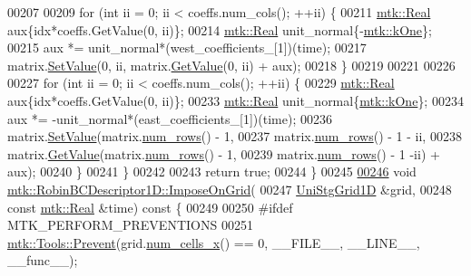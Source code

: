 \begin{DoxyCode}
00207 
00209     \textcolor{keywordflow}{for} (\textcolor{keywordtype}{int} ii = 0; ii < coeffs.num\_cols(); ++ii) \{
00211       \hyperlink{group__c01-roots_gac080bbbf5cbb5502c9f00405f894857d}{mtk::Real} aux\{idx*coeffs.GetValue(0, ii)\};
00214       \hyperlink{group__c01-roots_gac080bbbf5cbb5502c9f00405f894857d}{mtk::Real} unit\_normal\{-\hyperlink{group__c01-roots_ga26407c24d43b6b95480943340d285c71}{mtk::kOne}\};
00215       aux *= unit\_normal*(west\_coefficients\_[1])(time);
00217       matrix.\hyperlink{classmtk_1_1DenseMatrix_a784ce5784109ac86bfb9d8562b334b13}{SetValue}(0, ii, matrix.\hyperlink{classmtk_1_1DenseMatrix_a4b23ecbebd970b5eea915dbb50691024}{GetValue}(0, ii) + aux);
00218     \}
00219 
00221 
00226 
00227     \textcolor{keywordflow}{for} (\textcolor{keywordtype}{int} ii = 0; ii < coeffs.num\_cols(); ++ii) \{
00229       \hyperlink{group__c01-roots_gac080bbbf5cbb5502c9f00405f894857d}{mtk::Real} aux\{idx*coeffs.GetValue(0, ii)\};
00233       \hyperlink{group__c01-roots_gac080bbbf5cbb5502c9f00405f894857d}{mtk::Real} unit\_normal\{\hyperlink{group__c01-roots_ga26407c24d43b6b95480943340d285c71}{mtk::kOne}\};
00234       aux *= -unit\_normal*(east\_coefficients\_[1])(time);
00236       matrix.\hyperlink{classmtk_1_1DenseMatrix_a784ce5784109ac86bfb9d8562b334b13}{SetValue}(matrix.\hyperlink{classmtk_1_1DenseMatrix_a53f3afb3b6a8d21854458aaa9663cc74}{num\_rows}() - 1,
00237                       matrix.\hyperlink{classmtk_1_1DenseMatrix_a53f3afb3b6a8d21854458aaa9663cc74}{num\_rows}() - 1 - ii,
00238                       matrix.\hyperlink{classmtk_1_1DenseMatrix_a4b23ecbebd970b5eea915dbb50691024}{GetValue}(matrix.\hyperlink{classmtk_1_1DenseMatrix_a53f3afb3b6a8d21854458aaa9663cc74}{num\_rows}() - 1,
00239                                       matrix.\hyperlink{classmtk_1_1DenseMatrix_a53f3afb3b6a8d21854458aaa9663cc74}{num\_rows}() - 1 -ii) + aux);
00240     \}
00241   \}
00242 
00243   \textcolor{keywordflow}{return} \textcolor{keyword}{true};
00244 \}
00245 
\hypertarget{mtk__robin__bc__descriptor__1d_8cc_source_l00246}{}\hyperlink{classmtk_1_1RobinBCDescriptor1D_ab0daec1d6c5c9c6768bea08281a3831d}{00246} \textcolor{keywordtype}{void} \hyperlink{classmtk_1_1RobinBCDescriptor1D_ab0daec1d6c5c9c6768bea08281a3831d}{mtk::RobinBCDescriptor1D::ImposeOnGrid}(
00247     \hyperlink{classmtk_1_1UniStgGrid1D}{UniStgGrid1D} &grid,
00248     \textcolor{keyword}{const} \hyperlink{group__c01-roots_gac080bbbf5cbb5502c9f00405f894857d}{mtk::Real} &time)\textcolor{keyword}{ const }\{
00249 
00250 \textcolor{preprocessor}{  #ifdef MTK\_PERFORM\_PREVENTIONS}
00251   \hyperlink{classmtk_1_1Tools_a332324c6f25e66be9dff48c5987a3b9f}{mtk::Tools::Prevent}(grid.\hyperlink{classmtk_1_1UniStgGrid1D_af1b3729d8afa07be5b2775ed68015b80}{num\_cells\_x}() == 0, \_\_FILE\_\_, \_\_LINE\_\_, \_\_func\_\_);

\end{DoxyCode}

